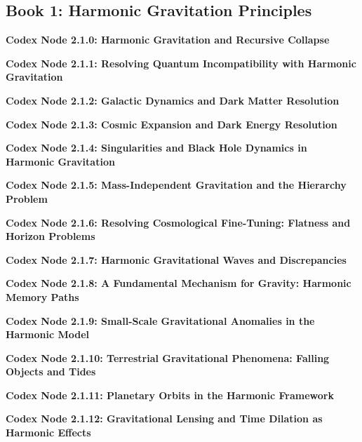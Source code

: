 \documentclass[a4paper,12pt]{book}
\newcommand{\codexnode}[5]{%
  \par\vspace{0.5em}%
  \noindent\textbf{Codex Node #1.#2.#3: #5}\label{#4}%
  \par\vspace{0.5em}%
}
\begin{document}
\subsection{Book 1: Harmonic Gravitation Principles}
\codexnode{2}{1}{0}{codex_harmonic_gravitation}{Harmonic Gravitation and Recursive Collapse}


\codexnode{2}{1}{1}{codex_quantum_compatibility}{Resolving Quantum Incompatibility with Harmonic Gravitation}


\codexnode{2}{1}{2}{codex_galactic_dynamics}{Galactic Dynamics and Dark Matter Resolution}


\codexnode{2}{1}{3}{codex_cosmic_expansion}{Cosmic Expansion and Dark Energy Resolution}


\codexnode{2}{1}{4}{codex_singularities_black_holes}{Singularities and Black Hole Dynamics in Harmonic Gravitation}


\codexnode{2}{1}{5}{codex_mass_hierarchy}{Mass-Independent Gravitation and the Hierarchy Problem}


\codexnode{2}{1}{6}{codex_cosmological_problems}{Resolving Cosmological Fine-Tuning: Flatness and Horizon Problems}


\codexnode{2}{1}{7}{codex_gravitational_waves}{Harmonic Gravitational Waves and Discrepancies}


\codexnode{2}{1}{8}{codex_fundamental_mechanism}{A Fundamental Mechanism for Gravity: Harmonic Memory Paths}


\codexnode{2}{1}{9}{codex_small_scale_anomalies}{Small-Scale Gravitational Anomalies in the Harmonic Model}


\codexnode{2}{1}{10}{codex_terrestrial_phenomena}{Terrestrial Gravitational Phenomena: Falling Objects and Tides}


\codexnode{2}{1}{11}{codex_orbital_dynamics}{Planetary Orbits in the Harmonic Framework}


\codexnode{2}{1}{12}{codex_optical_effects}{Gravitational Lensing and Time Dilation as Harmonic Effects}

\end{document}
